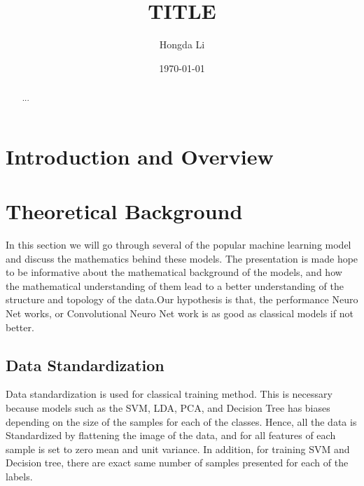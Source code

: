 \documentclass{article}
\title{TITLE}
\author{Hongda Li}
\date{\today}
\begin{document}
\maketitle

\begin{abstract}
   ...
\end{abstract}


\section{Introduction and Overview}


\section{Theoretical Background}
    \hspace{1.1em}
    In this section we will go through several of the popular machine learning model and discuss the mathematics behind these models. The presentation is made hope to be informative about the mathematical background of the models, and how the mathematical understanding of them lead to a better understanding of the structure and topology of the data.Our hypothesis is that, the performance Neuro Net works, or Convolutional Neuro Net work is as good as classical models if not better.  
    \subsection{Data Standardization}
        \hspace{1.1em}
        Data standardization is used for classical training method. This is necessary because models such as the SVM, LDA, PCA, and Decision Tree has biases depending on the size of the samples for each of the classes. Hence, all the data is Standardized by flattening the image of the data, and for all features of each sample is set to zero mean and unit variance. In addition, for training SVM and Decision tree, there are exact same number of samples presented for each of the labels. 
\end{document}
